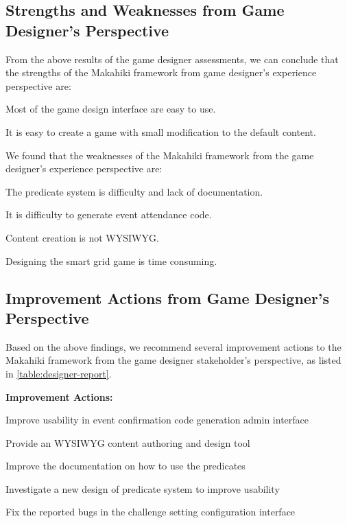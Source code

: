 \subsection{Strengths and Weaknesses from Game Designer's Perspective}
    
From the above results of the game designer assessments, we can conclude that the strengths of the Makahiki framework from game designer's experience perspective are:
    \begin{compactenum}
    \item Most of the game design interface are easy to use.
    \item It is easy to create a game with small modification to the default content.
    \end{compactenum} 

We found that the weaknesses of the Makahiki framework from the game designer's experience perspective are:
    \begin{compactenum}
    \item The predicate system is difficulty and lack of documentation. 
    \item It is difficulty to generate event attendance code.
    \item Content creation is not WYSIWYG.
    \item Designing the smart grid game is time consuming.
    \end{compactenum} 

\subsection{Improvement Actions from Game Designer's Perspective}

Based on the above findings, we recommend several improvement actions to the Makahiki framework from the game designer stakeholder's perspective, as listed in \autoref{table:designer-report}.

\begin{table}[ht!]
\begin{shadebox}
{\bf Improvement Actions:}
\begin{compactenum}
\item Improve usability in event confirmation code generation admin interface
\item Provide an WYSIWYG content authoring and design tool
\item Improve the documentation on how to use the predicates
\item Investigate a new design of predicate system to improve usability
\item Fix the reported bugs in the challenge setting configuration interface  
\end{compactenum}
\end{shadebox}
\caption{SGSEAM Improvement Action Report from Game Designer's Perspective}
\label{table:designer-report}
\end{table}

